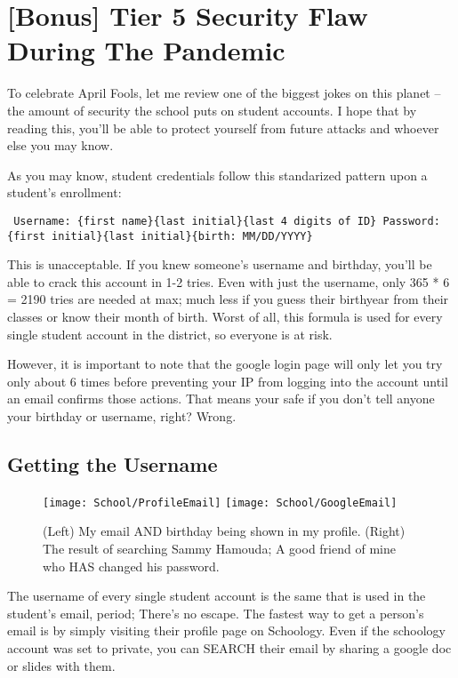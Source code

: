 \section{[Bonus] Tier 5 Security Flaw During The Pandemic}

To celebrate April Fools, let me review one of the biggest jokes on this planet -- the amount of security the school puts on student accounts. I hope that by reading this, you'll be able to protect yourself from future attacks and whoever else you may know.

As you may know, student credentials follow this standarized pattern upon a student's enrollment:

\begin{centering}
\texttt{
Username: \{first name\}\{last initial\}\{last 4 digits of ID\} \newline
Password: \{first initial\}\{last initial\}\{birth: MM/DD/YYYY\}
}
\end{centering}

This is unacceptable. If you knew someone's username and birthday, you'll be able to crack this account in 1-2 tries. Even with just the username, only 365 * 6 = 2190 tries are needed at max; much less if you guess their birthyear from their classes or know their month of birth. Worst of all, this formula is used for every single student account in the district, so everyone is at risk.

However, it is important to note that the google login page will only let you try only about 6 times before preventing your IP from logging into the account until an email confirms those actions. That means your safe if you don't tell anyone your birthday or username, right? Wrong.

\subsection{Getting the Username}


\begin{figure}[h]
    \centering
    \texttt{[image: School/ProfileEmail]}
    \texttt{[image: School/GoogleEmail]}
    \caption{
        (Left) My email AND birthday being shown in my profile. (Right) The result of searching Sammy Hamouda; A good friend of mine who HAS changed his password.
    }
\end{figure}

The username of every single student account is the same that is used in the student's email, period; There's no escape. The fastest way to get a person's email is by simply visiting their profile page on Schoology. Even if the schoology account was set to private, you can SEARCH their email by sharing a google doc or slides with them.

